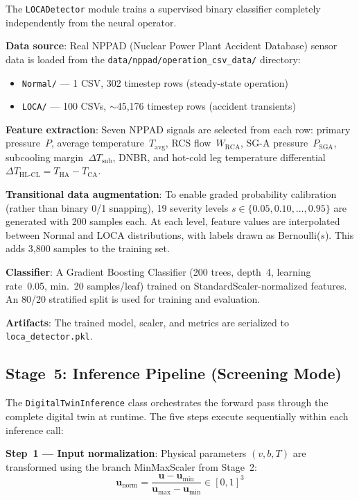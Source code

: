 \documentclass[conference]{IEEEtran}
\begin{document}
The \texttt{LOCADetector} module trains a supervised binary classifier completely independently from the neural operator.

\textbf{Data source}: Real NPPAD (Nuclear Power Plant Accident Database) sensor data is loaded from the \texttt{data/nppad/operation\_csv\_data/} directory:
\begin{itemize}
    \item \texttt{Normal/} --- 1 CSV, 302 timestep rows (steady-state operation)
    \item \texttt{LOCA/} --- 100 CSVs, $\sim$45,176 timestep rows (accident transients)
\end{itemize}

\textbf{Feature extraction}: Seven NPPAD signals are selected from each row: primary pressure~$P$, average temperature~$T_\text{avg}$, RCS flow~$W_\text{RCA}$, SG-A pressure~$P_\text{SGA}$, subcooling margin~$\Delta T_\text{sub}$, DNBR, and hot-cold leg temperature differential $\Delta T_\text{HL-CL} = T_\text{HA} - T_\text{CA}$.

\textbf{Transitional data augmentation}: To enable graded probability calibration (rather than binary 0/1 snapping), 19 severity levels $s \in \{0.05, 0.10, \ldots, 0.95\}$ are generated with 200 samples each. At each level, feature values are interpolated between Normal and LOCA distributions, with labels drawn as Bernoulli($s$). This adds 3,800 samples to the training set.

\textbf{Classifier}: A Gradient Boosting Classifier (200 trees, depth~4, learning rate~0.05, min.\ 20 samples/leaf) trained on StandardScaler-normalized features. An 80/20 stratified split is used for training and evaluation.

\textbf{Artifacts}: The trained model, scaler, and metrics are serialized to \texttt{loca\_detector.pkl}.

\subsection{Stage~5: Inference Pipeline (Screening Mode)}
\label{sec:inference_pipeline}

The \texttt{DigitalTwinInference} class orchestrates the forward pass through the complete digital twin at runtime. The five steps execute sequentially within each inference call:

\textbf{Step~1 --- Input normalization}: Physical parameters $(v, b, T)$ are transformed using the branch MinMaxScaler from Stage~2:
\begin{equation}
\bm{u}_\text{norm} = \frac{\bm{u} - \bm{u}_\text{min}}{\bm{u}_\text{max} - \bm{u}_\text{min}} \in [0,1]^3
\end{equation}
\end{document}
